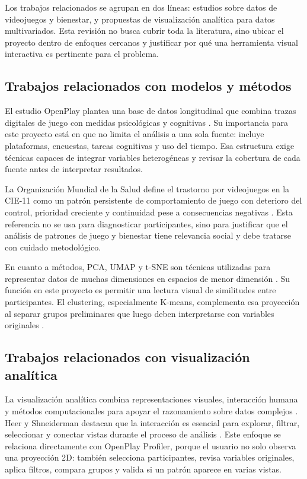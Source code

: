 \documentclass[12pt,a4paper]{article}
\begin{document}
Los trabajos relacionados se agrupan en dos l\'ineas: estudios sobre datos de videojuegos y bienestar, y propuestas de visualizaci\'on anal\'itica para datos multivariados. Esta revisi\'on no busca cubrir toda la literatura, sino ubicar el proyecto dentro de enfoques cercanos y justificar por qu\'e una herramienta visual interactiva es pertinente para el problema.

\subsection{Trabajos relacionados con modelos y m\'etodos}

El estudio OpenPlay plantea una base de datos longitudinal que combina trazas digitales de juego con medidas psicol\'ogicas y cognitivas \cite{openplay}. Su importancia para este proyecto est\'a en que no limita el an\'alisis a una sola fuente: incluye plataformas, encuestas, tareas cognitivas y uso del tiempo. Esa estructura exige t\'ecnicas capaces de integrar variables heterog\'eneas y revisar la cobertura de cada fuente antes de interpretar resultados.

La Organizaci\'on Mundial de la Salud define el trastorno por videojuegos en la CIE-11 como un patr\'on persistente de comportamiento de juego con deterioro del control, prioridad creciente y continuidad pese a consecuencias negativas \cite{who}. Esta referencia no se usa para diagnosticar participantes, sino para justificar que el an\'alisis de patrones de juego y bienestar tiene relevancia social y debe tratarse con cuidado metodol\'ogico.

En cuanto a m\'etodos, PCA, UMAP y t-SNE son t\'ecnicas utilizadas para representar datos de muchas dimensiones en espacios de menor dimensi\'on \cite{jolliffe,umap,tsne}. Su funci\'on en este proyecto es permitir una lectura visual de similitudes entre participantes. El clustering, especialmente K-means, complementa esa proyecci\'on al separar grupos preliminares que luego deben interpretarse con variables originales \cite{kmeans}.

\subsection{Trabajos relacionados con visualizaci\'on anal\'itica}

La visualizaci\'on anal\'itica combina representaciones visuales, interacci\'on humana y m\'etodos computacionales para apoyar el razonamiento sobre datos complejos \cite{keim}. Heer y Shneiderman destacan que la interacci\'on es esencial para explorar, filtrar, seleccionar y conectar vistas durante el proceso de an\'alisis \cite{heer}. Este enfoque se relaciona directamente con OpenPlay Profiler, porque el usuario no solo observa una proyecci\'on 2D: tambi\'en selecciona participantes, revisa variables originales, aplica filtros, compara grupos y valida si un patr\'on aparece en varias vistas.
\end{document}
